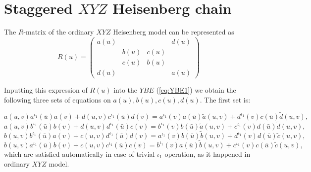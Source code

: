 \documentclass[a4paper,11pt]{article}
\begin{document}
\section{Staggered $XYZ$ Heisenberg chain}
\setcounter{equation}{0}

\indent
The $R$-matrix of the ordinary $XYZ$ Heisenberg model can be 
represented as
\begin{equation}
\label{R1/2}
R(u)=\left(
\begin{array}{cccc}
a(u)&&&d(u)\\
&b(u)&c(u)&\\
&c(u)&b(u)&\\
d(u)&&&a(u)
\end{array}\right)
\end{equation}

Inputting this expression of $R(u)$ into the $YBE$ (\ref{eq:YBE1})
we obtain the following three sets of equations on
$a(u), b(u), c(u), d(u)$. The first set is:

$$
a(u,v)a^{\iota_1}(\bar u)a(v)+d(u,v)c^{\iota_1}(\bar u)d(v)=
a^{\iota_1}(v)a(\bar u)\tilde a(u,v)+d^{\iota_1}(v)c(\bar u)\tilde d(u,v),
$$
$$
a(u,v)b^{\iota_1}(\bar u)b(v)+d(u,v)d^{\iota_1}(\bar u)c(v)=
b^{\iota_1}(v)b(\bar u)\tilde a(u,v)+c^{\iota_1}(v)d(\bar u)\tilde d(u,v),
$$
\begin{equation}
\label{i}
b(u,v)b^{\iota_1}(\bar u)a(v)+c(u,v)d^{\iota_1}(\bar u)d(v)=
a^{\iota_1}(v)b(\bar u)\tilde b(u,v)+d^{\iota_1}(v)d(\bar u)\tilde c(u,v),
\end{equation}
$$
b(u,v)a^{\iota_1}(\bar u)b(v)+c(u,v)c^{\iota_1}(\bar u)c(v)=
b^{\iota_1}(v)a(\bar u)\tilde b(u,v)+c^{\iota_1}(v)c(\bar u)\tilde c(u,v),
$$
which are satisfied automatically in case of trivial $\iota_1$
operation, as it happened in ordinary $XYZ$ model. 
\end{document}
